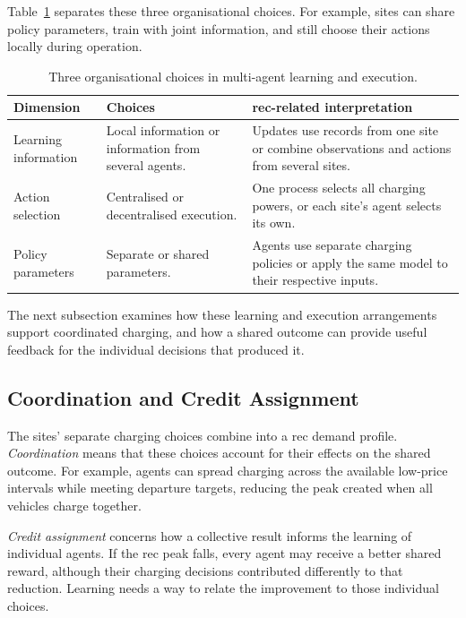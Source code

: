 Table~\ref{tab:ch2-learning-organisation} separates these three organisational choices. For example, sites can share policy parameters, train with joint information, and still choose their actions locally during operation.

\begin{table}[!tbp]
\centering\small
\caption{Three organisational choices in multi-agent learning and execution.}
\label{tab:ch2-learning-organisation}
\renewcommand{\arraystretch}{1.16}
\begin{tabularx}{\textwidth}{@{}>{\RaggedRight\arraybackslash}p{}>{\RaggedRight\arraybackslash}X>{\RaggedRight\arraybackslash}X@{}}
\toprule
\textbf{Dimension} & \textbf{Choices} & \textbf{\gls{rec}-related interpretation}\\\midrule
Learning information & Local information or information from several agents. & Updates use records from one site or combine observations and actions from several sites.\\\addlinespace[5pt]
Action selection & Centralised or decentralised execution. & One process selects all charging powers, or each site's agent selects its own.\\\addlinespace[5pt]
Policy parameters & Separate or shared parameters. & Agents use separate charging policies or apply the same model to their respective inputs.\\\bottomrule
\end{tabularx}
\end{table}

The next subsection examines how these learning and execution arrangements support coordinated charging, and how a shared outcome can provide useful feedback for the individual decisions that produced it.

\subsection{Coordination and Credit Assignment}
\label{sec:ch2-credit}

The sites' separate charging choices combine into a \gls{rec} demand profile. \emph{Coordination} means that these choices account for their effects on the shared outcome. For example, agents can spread charging across the available low-price intervals while meeting departure targets, reducing the peak created when all vehicles charge together.

\emph{Credit assignment} concerns how a collective result informs the learning of individual agents. If the \gls{rec} peak falls, every agent may receive a better shared reward, although their charging decisions contributed differently to that reduction. Learning needs a way to relate the improvement to those individual choices.

